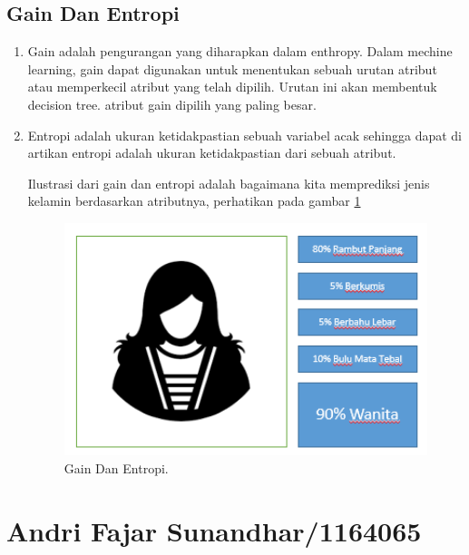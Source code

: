 \subsection{Gain Dan Entropi}
\begin{enumerate}
\item Gain adalah pengurangan yang diharapkan dalam enthropy. Dalam mechine learning, gain dapat digunakan untuk menentukan sebuah urutan atribut atau memperkecil atribut yang telah dipilih. Urutan ini akan membentuk decision tree. atribut gain dipilih yang paling besar.

\item Entropi adalah ukuran ketidakpastian sebuah variabel acak sehingga dapat di artikan entropi adalah ukuran ketidakpastian dari sebuah atribut.

\subitem Ilustrasi dari gain dan entropi adalah bagaimana kita memprediksi jenis kelamin berdasarkan atributnya, perhatikan pada gambar \ref{YNGE}

		\begin{figure}[ht]
		\centerline{\includegraphics[width=1\textwidth]{figures/YN/YN57.png}}
		\caption{Gain Dan Entropi.}
		\label{YNGE}
		\end{figure}
\end{enumerate}

 \section{Andri Fajar Sunandhar/1164065}
